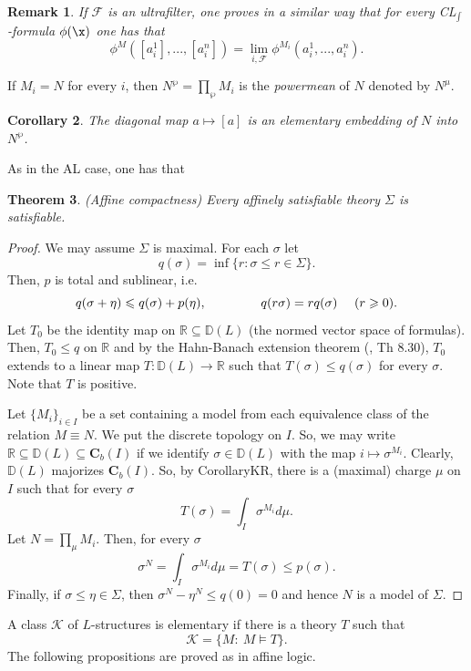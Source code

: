 \documentclass[12pt]{article}
\newtheorem{theorem}{Theorem}[section]
\newtheorem{corollary}[theorem]{Corollary}
\newtheorem{remark}[theorem]{Remark}
\def\Rn{\mathbb R}
\begin{document}
\begin{remark}
\emph{If $\mathcal F$ is an ultrafilter, one proves in a similar way that for every CL$_{\int}$-formula $\phi(\x)$
one has that $$\phi^M([a^1_i],...,[a^n_i])=\lim_{i,\mathcal F}\phi^{M_i}(a^1_i,...,a^n_i).$$}
\end{remark}

If $M_i=N$ for every $i$, then $N^\wp=\prod_\wp M_i$ is the \emph{powermean} of $N$ denoted by $N^\mu$.

\begin{corollary}
The diagonal map $a\mapsto[a]$ is an elementary embedding of $N$ into $N^\wp$.
\end{corollary}

As in the AL case, one has that

\begin{theorem} \label{affine compactness}
(Affine compactness) Every affinely satisfiable theory $\Sigma$ is satisfiable.
\end{theorem}
\begin{proof}
We may assume $\Sigma$ is maximal. For each $\sigma$ let $$q(\sigma)=\inf\{r:\sigma\leqslant r\in\Sigma\}.$$
Then, $p$ is total and sublinear, i.e.
$$q(\sigma+\eta)\leqslant q(\sigma)+p(\eta), \hspace{15mm} q(r\sigma)=rq(\sigma)\ \ \ \ (r\geqslant0).$$
Let $T_0$ be the identity map on $\Rn\subseteq\mathbb{D}(L)$ (the normed vector space of formulas).
Then, $T_0\leqslant q$ on $\Rn$ and by the Hahn-Banach extension theorem (\cite{Aliprantis-Inf}, Th 8.30),
$T_0$ extends to a linear map $T:\mathbb{D}(L)\rightarrow\Rn$ such that $T(\sigma)\leqslant q(\sigma)$ for every $\sigma$.
Note that $T$ is positive.

Let $\{M_i\}_{i\in I}$ be a set containing a model from each equivalence class of the relation $M\equiv N$.
We put the discrete topology on $I$. So, we may write $\Rn\subseteq\mathbb{D}(L)\subseteq\mathbf{C}_b(I)$
if we identify $\sigma\in\mathbb{D}(L)$ with the map $i\mapsto\sigma^{M_i}$.
Clearly, $\mathbb{D}(L)$ majorizes $\mathbf{C}_b(I)$. So, by Corollary{KR},
there is a (maximal) charge $\mu$ on $I$ such that for every $\sigma$ $$T(\sigma)=\int_I\sigma^{M_i}d\mu.$$
Let $N=\prod_{\mu}M_i$. Then, for every $\sigma$ $$\sigma^N=\int_I\sigma^{M_i}d\mu=T(\sigma)\leqslant p(\sigma).$$
Finally, if $\sigma\leqslant\eta\in\Sigma$, then $\sigma^N-\eta^N\leqslant q(0)=0$ and hence $N$ is a model of $\Sigma$.
\end{proof}

A class $\mathcal K$ of $L$-structures is elementary if there is a theory $T$ such that $$\mathcal K=\{M:\ M\vDash T\}.$$
The following propositions are proved as in affine logic.
\end{document}
